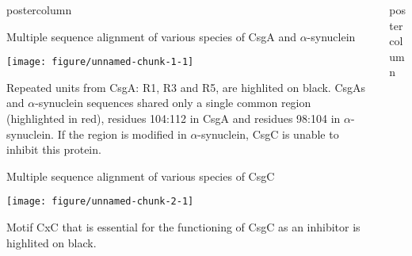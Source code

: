 \documentclass[final]{beamer}\usepackage[]{graphicx}\usepackage[]{color}
\makeatletter
\def\maxwidth{ %
  \ifdim\Gin@nat@width>\linewidth
    \linewidth
  \else
    \Gin@nat@width
  \fi
}
\def\maxwidth{ %
  \ifdim\Gin@nat@width>\linewidth
    \linewidth
  \else
    \Gin@nat@width
  \fi
}
\newlength{\columnheight}
\makeatother
\begin{document}
\begin{frame}
\begin{columns}
\begin{column}{.5\textwidth}
\begin{beamercolorbox}[center,wd=\textwidth]{postercolumn}
\begin{minipage}[T]{.99\textwidth}
{%


\vfill
\begin{block}{Multiple sequence alignment of various species of CsgA and $\alpha$-synuclein} 

\texttt{[image: figure/unnamed-chunk-1-1]} 

\justify Repeated units from CsgA: R1, R3 and R5, are highlited on black. CsgAs and $\alpha$-synuclein sequences shared only a single common region (highlighted in red), residues 104{:}112 in CsgA and residues 98{:}104 in $\alpha$-synuclein. If the region is modified in $\alpha$-synuclein, CsgC is unable to inhibit this protein.
\end{block}

\begin{block}{Multiple sequence alignment of various species of CsgC}

\texttt{[image: figure/unnamed-chunk-2-1]} 

\justify Motif CxC that is essential for the functioning of CsgC as an inhibitor is highlited on black.

\end{block}
}
\end{minipage}
\end{beamercolorbox}
\end{column}



\begin{column}{.47\textwidth} %
\begin{beamercolorbox}[center,wd=\textwidth]{postercolumn}
\begin{minipage}[T]{.99\textwidth}  
\parbox[t][\columnheight]{\textwidth}
{



}
\end{minipage}
\end{beamercolorbox}
\end{column}
\end{columns}
\end{frame}
\end{document}
